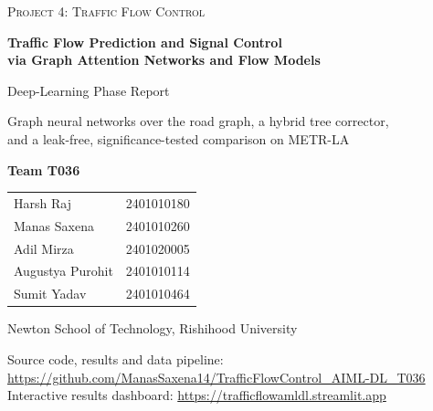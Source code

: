 \documentclass[11pt,a4paper]{article}
\newcommand{\repository}{\url{https://github.com/ManasSaxena14/TrafficFlowControl_AIML-DL_T036}}
\newcommand{\dashboard}{\url{https://trafficflowamldl.streamlit.app}}
\begin{document}
\begin{titlepage}
\centering
\vspace*{1.2cm}
{\large\color{accent}\textsc{Project 4: Traffic Flow Control}\par}
\vspace{0.6cm}
{\LARGE\bfseries\color{navy} Traffic Flow Prediction and Signal Control\\[4pt] via Graph Attention Networks and Flow Models\par}
\vspace{0.5cm}
{\Large Deep-Learning Phase Report\par}
\vspace{0.3cm}
{\large Graph neural networks over the road graph, a hybrid tree corrector,\\ and a leak-free, significance-tested comparison on METR-LA\par}
\vspace{1.4cm}


\vspace{1.6cm}
{\large\bfseries Team T036\par}
\vspace{0.2cm}
\begin{tabular}{ll}
Harsh Raj & 2401010180\\
Manas Saxena & 2401010260\\
Adil Mirza & 2401020005\\
Augustya Purohit & 2401010114\\
Sumit Yadav & 2401010464
\end{tabular}

\vspace{0.6cm}
Newton School of Technology, Rishihood University\par
\vfill
{\small Source code, results and data pipeline: \repository\\
Interactive results dashboard: \dashboard\par}
\end{titlepage}
\end{document}
